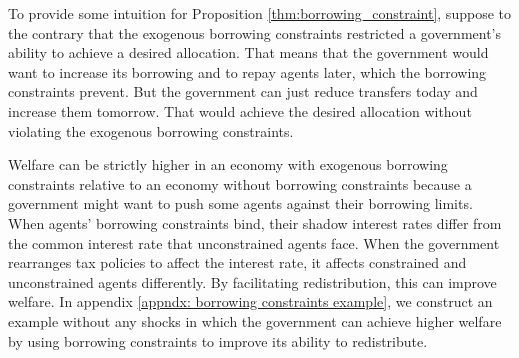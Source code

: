 \documentclass[11.5pt,twoside]{article}
\begin{document}
To provide some intuition for Proposition \ref{thm:borrowing_constraint}, suppose to the contrary that the exogenous borrowing constraints  restricted a  government's
 ability to achieve a desired allocation. That  means that
the government would want to increase  its borrowing
and to repay agents later, which the borrowing constraints prevent. But the government can just reduce
transfers today and increase them tomorrow. That would  achieve the  desired  allocation
without violating the exogenous borrowing constraints.

Welfare can  be strictly higher in an economy  with exogenous
borrowing constraints  relative to an economy without borrowing constraints because  a government might want to
push some agents against their borrowing limits. When agents' borrowing
constraints bind, their shadow interest rates differ from the
common interest rate that unconstrained agents face. When the government rearranges tax
policies to  affect the  interest rate, it affects constrained and unconstrained agents
 differently.  By facilitating
redistribution, this can improve welfare. %
In appendix \ref{appndx: borrowing constraints example}, we construct an example without any
shocks in which the government can achieve higher welfare by using borrowing
constraints to improve its ability to redistribute.
\end{document}

